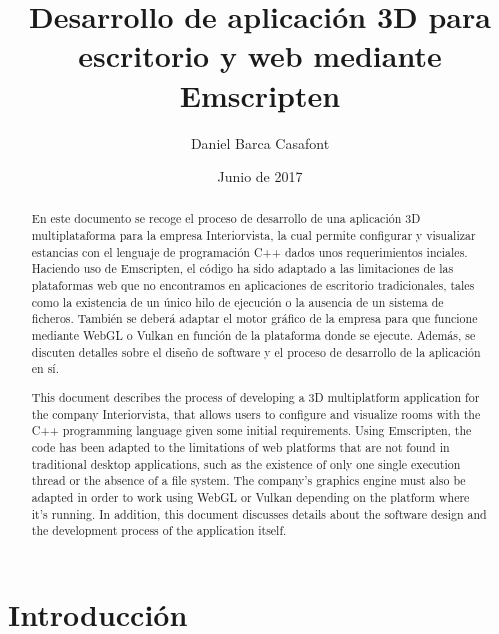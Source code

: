 \documentclass{report}
\title{Desarrollo de aplicación 3D para escritorio y web mediante Emscripten}
\author{Daniel Barca Casafont}
\date{Junio de 2017}
\begin{document}
\begin{titlepage}
\maketitle
\end{titlepage}

\cleardoublepage
\renewcommand{\contentsname}{Índice}
\tableofcontents

\cleardoublepage
\begin{abstract}
En este documento se recoge el proceso de desarrollo de una aplicación 3D multiplataforma para la empresa Interiorvista, la cual permite configurar y visualizar estancias con el lenguaje de programación C++ dados unos requerimientos inciales. Haciendo uso de Emscripten, el código ha sido adaptado a las limitaciones de las plataformas web que no encontramos en aplicaciones de escritorio tradicionales, tales como la existencia de un único hilo de ejecución o la ausencia de un sistema de ficheros. También se deberá adaptar el motor gráfico de la empresa para que funcione mediante WebGL o Vulkan en función de la plataforma donde se ejecute. Además, se discuten detalles sobre el diseño de software y el proceso de desarrollo de la aplicación en sí.

This document describes the process of developing a 3D multiplatform application for the company Interiorvista, that allows users to configure and visualize rooms with the C++ programming language given some initial requirements. Using Emscripten, the code has been adapted to the limitations of web platforms that are not found in traditional desktop applications, such as the existence of only one single execution thread or the absence of a file system. The company's graphics engine must also be adapted in order to work using WebGL or Vulkan depending on the platform where it's running. In addition, this document discusses details about the software design and the development process of the application itself.
\end{abstract}

\cleardoublepage
\renewcommand{\listfigurename}{Lista de Figuras}
\listoffigures

\cleardoublepage
{}

\chapter{Introducción}


\cleardoublepage
\end{document}
